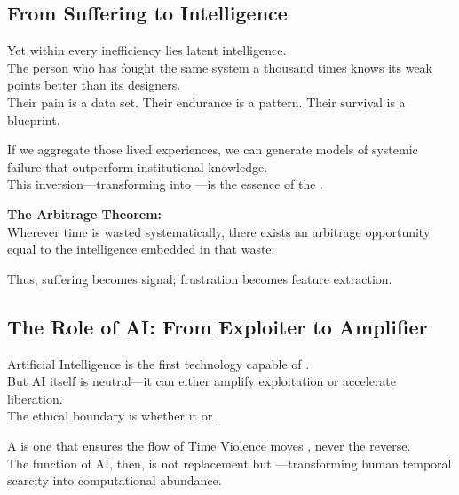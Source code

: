 \subsection{From Suffering to Intelligence}
\label{sec:suffering-to-intelligence}

Yet within every inefficiency lies latent intelligence.\\
The person who has fought the same system a thousand times knows its weak points better than its designers.\\
Their pain is a data set. Their endurance is a pattern. Their survival is a blueprint.

If we aggregate those lived experiences, we can generate models of systemic failure that outperform institutional knowledge.\\
This inversion—transforming  into —is the essence of the .

\begin{keyproposition}
\textbf{The Arbitrage Theorem:}\\
Wherever time is wasted systematically, there exists an arbitrage opportunity equal to the intelligence embedded in that waste.
\end{keyproposition}

Thus, suffering becomes signal; frustration becomes feature extraction.

\subsection{The Role of AI: From Exploiter to Amplifier}
\label{sec:role-of-ai}

Artificial Intelligence is the first technology capable of .\\
But AI itself is neutral—it can either amplify exploitation or accelerate liberation.\\
The ethical boundary is whether it  or .

A  is one that ensures the flow of Time Violence moves , never the reverse.\\
The function of AI, then, is not replacement but —transforming human temporal scarcity into computational abundance.


